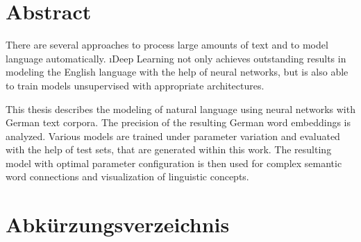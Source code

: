 \chapter*{Abstract}
\endgroup
There are several approaches to process large amounts of text and to model language automatically. \i{Deep Learning} not only achieves outstanding results in modeling the English language with the help of neural networks, but is also able to train models unsupervised with appropriate architectures.

This thesis describes the modeling of natural language using neural networks with German text corpora. The precision of the resulting German word embeddings is analyzed. Various models are trained under parameter variation and evaluated with the help of test sets, that are generated within this work. The resulting model with optimal parameter configuration is then used for complex semantic word connections and visualization of linguistic concepts.


\tableofcontents
\listoffigures
\listoftables

\chapter*{Abkürzungsverzeichnis}\label{s.abbr}
\begin{acronym}[----------------]
\end{acronym}


